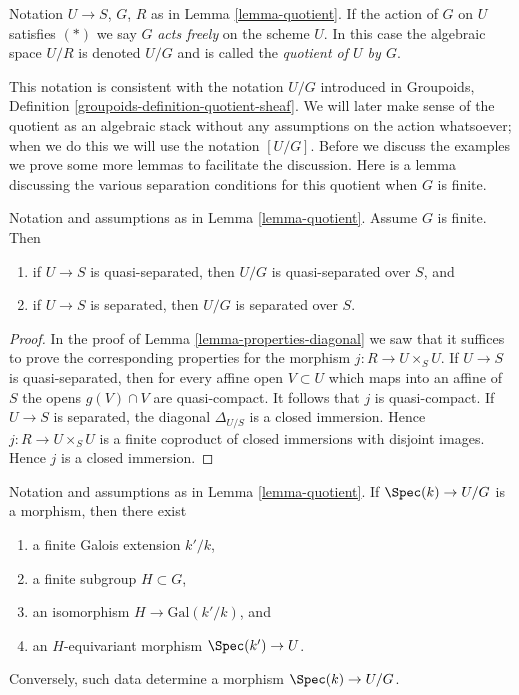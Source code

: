 \begin{definition}
\label{definition-quotient}
Notation $U \to S$, $G$, $R$ as in Lemma \ref{lemma-quotient}.
If the action of $G$ on $U$ satisfies $(*)$ we say $G$ {\it acts freely}
on the scheme $U$. In this case the algebraic space $U/R$ is denoted
$U/G$ and is called the {\it quotient of $U$ by $G$}.
\end{definition}

\noindent
This notation is consistent with the notation $U/G$ introduced in
Groupoids, Definition \ref{groupoids-definition-quotient-sheaf}.
We will later make sense of the quotient as an algebraic stack without
any assumptions on the action whatsoever; when we do this we will use the
notation $[U/G]$. Before we discuss the examples we prove
some more lemmas to facilitate the discussion. Here is a lemma discussing the
various separation conditions for this quotient when $G$ is finite.

\begin{lemma}
\label{lemma-quotient-finite-separated}
Notation and assumptions as in Lemma \ref{lemma-quotient}.
Assume $G$ is finite. Then
\begin{enumerate}
\item if $U \to S$ is quasi-separated, then $U/G$ is quasi-separated
over $S$, and
\item if $U \to S$ is separated, then $U/G$ is separated over $S$.
\end{enumerate}
\end{lemma}

\begin{proof}
In the proof of Lemma \ref{lemma-properties-diagonal}
we saw that it suffices to prove the
corresponding properties for the morphism $j : R \to U \times_S U$.
If $U \to S$ is quasi-separated, then for every affine open $V \subset U$
which maps into an affine of $S$
the opens $g(V) \cap V$ are quasi-compact. It follows that $j$ is
quasi-compact.
If $U \to S$ is separated, the diagonal $\Delta_{U/S}$ is a closed
immersion. Hence $j : R \to U \times_S U$ is a finite coproduct
of closed immersions with disjoint images. Hence $j$ is a closed immersion.
\end{proof}

\begin{lemma}
\label{lemma-quotient-field-map}
Notation and assumptions as in Lemma \ref{lemma-quotient}.
If $\Spec(k) \to U/G$ is a morphism, then there exist
\begin{enumerate}
\item a finite Galois extension $k'/k$,
\item a finite subgroup $H \subset G$,
\item an isomorphism $H \to \text{Gal}(k'/k)$, and
\item an $H$-equivariant morphism $\Spec(k') \to U$.
\end{enumerate}
Conversely, such data determine a morphism $\Spec(k) \to U/G$.
\end{lemma}

